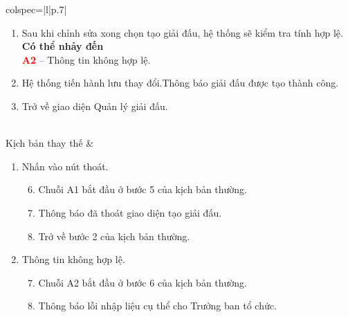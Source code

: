 \begin{longtblr}[caption = {Đặc tả usecase Tạo giải đấu},
  label = {tab:usecase1-spec},]{colspec={|l|p{.7\linewidth}|}}
\begin{minipage}{\linewidth}
\begin{enumerate}
            \textbf{Có thể nhảy đến}\\
            \textbf{\textcolor{red}{A1}} -- Trưởng ban tổ chức không nhập nữa và nhấn vào nút thoát.
      \item Sau khi chỉnh sửa xong chọn tạo giải đấu, hệ thống sẽ kiểm tra tính hợp lệ.\\
            \textbf{Có thể nhảy đến}\\
            \textbf{\textcolor{red}{A2}} -- Thông tin không hợp lệ.
      \item Hệ thống tiến hành lưu thay đổi.Thông báo giải đấu được tạo thành công.
      \item Trở về giao diện Quản lý giải đấu.
    \end{enumerate}
    \vskip 1pt
  \end{minipage}
  \\\hline
  Kịch bản thay thế    &
  \begin{minipage}{\linewidth}
    \vskip 4pt
    \begin{enumerate}[label={\textbf{\textcolor{red}{A\arabic*}} --}, align=left, itemsep=-5pt]
      \item  Nhấn vào nút thoát.  \\
            \vspace{-1.5em}
            \begin{enumerate}[leftmargin=-5px, align=left, label=\arabic*.]
              \setcounter{enumii}{5}
              \item[]
                    \hspace{-25px} Chuỗi A1 bắt đầu ở bước 5 của kịch bản thường.
              \item Thông báo đã thoát giao diện tạo giải đấu.
              \item[]
                    \hspace{-25px} Trở về bước 2 của kịch bản thường.
            \end{enumerate}
      \item Thông tin không hợp lệ. \\
            \vspace{-1.5em}
            \begin{enumerate}[leftmargin=-5px, align=left, label=\arabic*.]
              \setcounter{enumii}{6}
              \item[]
                    \hspace{-25px} Chuỗi A2 bắt đầu ở bước 6 của kịch bản thường.
              \item Thông báo lỗi nhập liệu cụ thể cho Trưởng ban tổ chức.

\end{enumerate}
\end{enumerate}
\end{minipage}
\end{longtblr}
